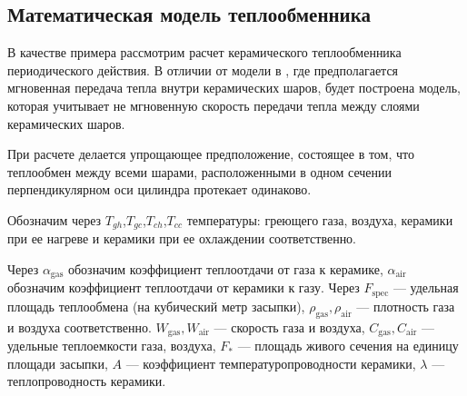 \documentclass[a4paper,11pt,numreferences,mathsec,kaplist]{isuepsutf8}
\begin{document}
\begin{article}
\section{Математическая модель теплообменника}

В качестве примера рассмотрим расчет керамического теплообменника
периодического действия. В отличии от модели в \cite{KMP2018}, где
предполагается мгновенная передача тепла внутри керамических шаров,
будет построена модель, которая учитывает не мгновенную скорость
передачи тепла между слоями керамических шаров. 

При расчете делается упрощающее предположение, состоящее в том, что
теплообмен между всеми шарами, расположенными в одном сечении
перпендикулярном оси цилиндра протекает одинаково.

Обозначим через $T_{gh}$,$T_{gc}$,$T_{ch}$,$T_{cc}$ температуры: греющего
газа, воздуха, керамики при ее нагреве и керамики при ее охлаждении
соответственно.

Через $\alpha_{\text{gas}}$ обозначим коэффициент теплоотдачи от газа к
керамике, $\alpha_{\text{air}}$ обозначим коэффициент теплоотдачи от
керамики к газу. Через $F_{\text{spec}}$  --- удельная площадь теплообмена
(на кубический метр
засыпки), $\rho_{\text{gas}}, \rho_{\text{air}}$ --- плотность газа и воздуха
соответственно. $W_{\text{gas}},W_{\text{air}}$ --- скорость газа и
воздуха, $C_{\text{gas}},C_{\text{air}}$ --- удельные теплоемкости газа,
воздуха, $F_{*}$ --- площадь живого сечения
на единицу площади засыпки, $A$ --- коэффициент температуропроводности керамики,
$\lambda$ --- теплопроводность керамики.


\end{article}
\end{document}
